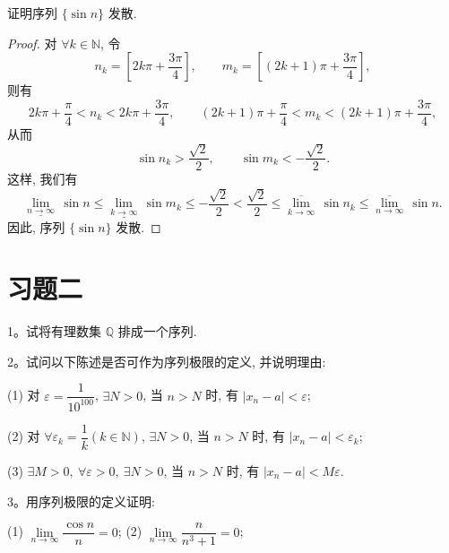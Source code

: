 \begin{example}\label{example:ma-2-5-4}
证明序列 $\{\sin n\}$ 发散.
\end{example}


\begin{proof}
对 $\forall k\in\mathbb{N}$, 令
\[
  n_k=\left[2k\pi+\frac{3\pi}{4}\right],
  \qquad
  m_k=\left[(2k+1)\pi+\frac{3\pi}{4}\right],
\]
则有
\[
  2k\pi+\frac\pi4<n_k<2k\pi+\frac{3\pi}{4},
  \qquad
  (2k+1)\pi+\frac\pi4<m_k<(2k+1)\pi+\frac{3\pi}{4},
\]
从而
\[
  \sin n_k>\frac{\sqrt2}{2},
  \qquad
  \sin m_k<-\frac{\sqrt2}{2}.
\]
这样, 我们有
\[
  \underline{\lim_{n\to\infty}}\,\sin n
  \leqslant
  \underline{\lim_{k\to\infty}}\,\sin m_k
  \leqslant
  -\frac{\sqrt2}{2}
  <
  \frac{\sqrt2}{2}
  \leqslant
  \overline{\lim_{k\to\infty}}\,\sin n_k
  \leqslant
  \overline{\lim_{n\to\infty}}\,\sin n.
\]
因此, 序列 $\{\sin n\}$ 发散.
\end{proof}


\section*{习题二}
{}
\label{exercises:ma-2}

1。试将有理数集 $\mathbb{Q}$ 排成一个序列.

2。试问以下陈述是否可作为序列极限的定义, 并说明理由:

(1) 对 $\varepsilon=\dfrac1{10^{100}}$, $\exists N>0$, 当 $n>N$ 时, 有 $|x_n-a|<\varepsilon$;

(2) 对 $\forall\varepsilon_k=\dfrac1k(k\in\mathbb{N})$, $\exists N>0$, 当 $n>N$ 时, 有 $|x_n-a|<\varepsilon_k$;

(3) $\exists M>0,\ \forall\varepsilon>0,\ \exists N>0$, 当 $n>N$ 时, 有 $|x_n-a|<M\varepsilon$.

3。用序列极限的定义证明:

(1) $\lim\limits_{n\to\infty}\dfrac{\cos n}{n}=0$;\qquad
(2) $\lim\limits_{n\to\infty}\dfrac{n}{n^3+1}=0$;

